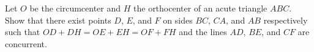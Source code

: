 Let $O$ be the circumcenter and $H$ the orthocenter of an acute triangle $ABC$. Show that there exist points $D$, $E$, and $F$ on sides $BC$, $CA$, and $AB$ respectively such that $OD + DH = OE + EH = OF + FH$ and the lines $AD$, $BE$, and $CF$ are concurrent.
